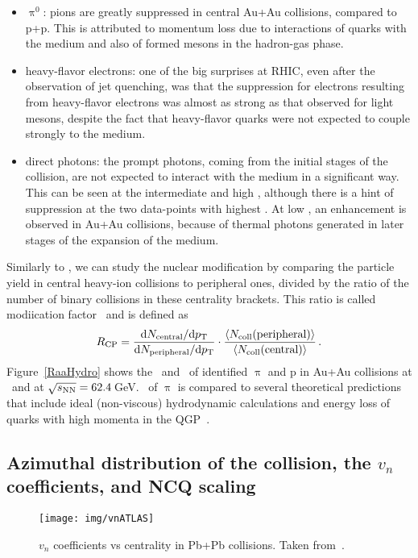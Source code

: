 \begin{itemize}
 \item $\uppi^0$: pions are greatly suppressed in central Au+Au collisions, compared to p+p. This is attributed to momentum loss due to interactions of quarks with the medium and also of formed mesons in the hadron-gas phase.
 \item heavy-flavor electrons: one of the big surprises at RHIC, even after the observation of jet
quenching, was that the suppression for electrons resulting from heavy-flavor electrons was almost as strong as that observed
for light mesons, despite the fact that heavy-flavor quarks were not expected to couple
strongly to the medium.
 \item direct photons: the prompt photons, coming from the initial stages of the collision, are not expected to interact with the medium in a significant way. This can be seen at the intermediate and high \pt, although there is a hint of suppression at the two data-points with highest \pt\@. At low \pt, an enhancement is observed in Au+Au collisions, because of thermal photons generated in later stages of the expansion of the medium.
\end{itemize}

Similarly to \Raa, we can study the nuclear modification by comparing the particle yield in central heavy-ion collisions to peripheral ones, divided by the ratio of the number of binary collisions in these centrality brackets. This ratio is called modiication factor \Rcp\ and is defined as
\begin{equation}
 R_\text{CP} = \frac{\mathrm{d} N_\mathrm{central}/\mathrm{d} {p_{\mathrm{T}}}}
{\mathrm{d} N_\mathrm{peripheral}/\mathrm{d} {p_{\mathrm{T}}}} \cdot
\frac{\langle N_\mathrm{coll} (\text{peripheral}) \rangle}
{\langle N_\mathrm{coll} (\text{central}) \rangle}\,.
\end{equation}
Figure~\ref{RaaHydro} shows the \Raa\ and \Rcp\ of identified $\uppi$ and p in Au+Au collisions at \snnFull\ and at $\sqrt{s_\text{NN}} = 62.4\,$GeV\@. \Raa\ of $\uppi$ is compared to several theoretical predictions that include ideal (non-viscous) hydrodynamic calculations and energy loss of quarks with high momenta in the QGP~\cite{Alam, Wang, Vitev}\@. 



\subsection{Azimuthal distribution of the collision, the $v_n$ coefficients, and NCQ scaling}
\begin{figure}[!htb]
\centering
\texttt{[image: img/vnATLAS]}
\caption[$v_n$ coefficients vs centrality in Pb+Pb collisions.]{\label{vnATLAS}$v_n$ coefficients vs centrality in Pb+Pb collisions. Taken from~\cite{vnATLAS}\@.}

\end{figure}

